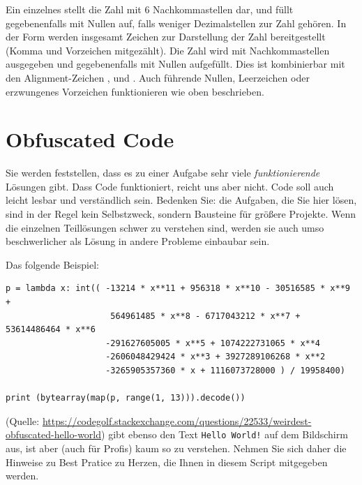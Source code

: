 Ein einzelnes  stellt die Zahl mit 6 Nachkommastellen dar, und füllt gegebenenfalls mit Nullen auf, falls weniger Dezimalstellen zur Zahl gehören. In der Form  werden insgesamt  Zeichen zur Darstellung der Zahl bereitgestellt (Komma und Vorzeichen mitgezählt). Die Zahl wird mit  Nachkommastellen ausgegeben und gegebenenfalls mit Nullen aufgefüllt. Dies ist kombinierbar mit den Alignment-Zeichen \inPy{<}, \inPy{>} und \inPy{^}. Auch führende Nullen, Leerzeichen oder erzwungenes Vorzeichen funktionieren wie oben beschrieben.

\section{Obfuscated Code}
Sie werden feststellen, dass es zu einer Aufgabe sehr viele \emph{funktionierende} Lösungen gibt. Dass Code funktioniert, reicht uns aber nicht. Code soll auch leicht lesbar und verständlich sein. Bedenken Sie: die Aufgaben, die Sie hier lösen, sind in der Regel kein Selbstzweck, sondern Bausteine für größere Projekte. Wenn die einzelnen Teillösungen schwer zu verstehen sind, werden sie auch umso beschwerlicher als Lösung in andere Probleme einbaubar sein.

Das folgende Beispiel:
\begin{codebox}
\begin{verbatim}
p = lambda x: int(( -13214 * x**11 + 956318 * x**10 - 30516585 * x**9 + 
                     564961485 * x**8 - 6717043212 * x**7 + 53614486464 * x**6 
                    -291627605005 * x**5 + 1074222731065 * x**4 
                    -2606048429424 * x**3 + 3927289106268 * x**2
                    -3265905357360 * x + 1116073728000 ) / 19958400)

print (bytearray(map(p, range(1, 13))).decode())
\end{verbatim}
\end{codebox}
(Quelle: \url{https://codegolf.stackexchange.com/questions/22533/weirdest-obfuscated-hello-world})
gibt ebenso den Text \texttt{Hello World!} auf dem Bildschirm aus, ist aber (auch für Profis) kaum so zu verstehen. Nehmen Sie sich daher die Hinweise zu Best Pratice zu Herzen, die Ihnen in diesem Script mitgegeben werden.